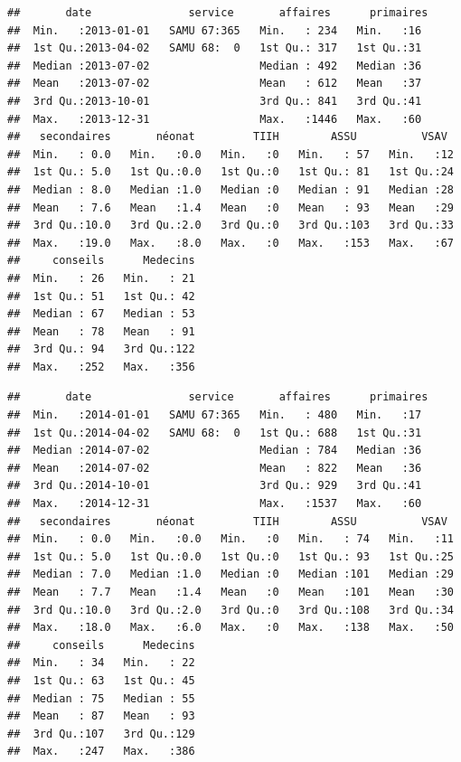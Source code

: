 \documentclass[]{article}
\newenvironment{Shaded}{\begin{snugshade}}{\end{snugshade}}
\newcommand{\KeywordTok}[1]{\textcolor[rgb]{0.13,0.29,0.53}{\textbf{{#1}}}}
\newcommand{\StringTok}[1]{\textcolor[rgb]{0.31,0.60,0.02}{{#1}}}
\newcommand{\CommentTok}[1]{\textcolor[rgb]{0.56,0.35,0.01}{\textit{{#1}}}}
\newcommand{\NormalTok}[1]{{#1}}
\begin{document}
\begin{verbatim}
##       date               service       affaires      primaires 
##  Min.   :2013-01-01   SAMU 67:365   Min.   : 234   Min.   :16  
##  1st Qu.:2013-04-02   SAMU 68:  0   1st Qu.: 317   1st Qu.:31  
##  Median :2013-07-02                 Median : 492   Median :36  
##  Mean   :2013-07-02                 Mean   : 612   Mean   :37  
##  3rd Qu.:2013-10-01                 3rd Qu.: 841   3rd Qu.:41  
##  Max.   :2013-12-31                 Max.   :1446   Max.   :60  
##   secondaires       néonat         TIIH        ASSU          VSAV   
##  Min.   : 0.0   Min.   :0.0   Min.   :0   Min.   : 57   Min.   :12  
##  1st Qu.: 5.0   1st Qu.:0.0   1st Qu.:0   1st Qu.: 81   1st Qu.:24  
##  Median : 8.0   Median :1.0   Median :0   Median : 91   Median :28  
##  Mean   : 7.6   Mean   :1.4   Mean   :0   Mean   : 93   Mean   :29  
##  3rd Qu.:10.0   3rd Qu.:2.0   3rd Qu.:0   3rd Qu.:103   3rd Qu.:33  
##  Max.   :19.0   Max.   :8.0   Max.   :0   Max.   :153   Max.   :67  
##     conseils      Medecins  
##  Min.   : 26   Min.   : 21  
##  1st Qu.: 51   1st Qu.: 42  
##  Median : 67   Median : 53  
##  Mean   : 78   Mean   : 91  
##  3rd Qu.: 94   3rd Qu.:122  
##  Max.   :252   Max.   :356
\end{verbatim}

\begin{Shaded}
\end{Shaded}

\begin{verbatim}
##       date               service       affaires      primaires 
##  Min.   :2014-01-01   SAMU 67:365   Min.   : 480   Min.   :17  
##  1st Qu.:2014-04-02   SAMU 68:  0   1st Qu.: 688   1st Qu.:31  
##  Median :2014-07-02                 Median : 784   Median :36  
##  Mean   :2014-07-02                 Mean   : 822   Mean   :36  
##  3rd Qu.:2014-10-01                 3rd Qu.: 929   3rd Qu.:41  
##  Max.   :2014-12-31                 Max.   :1537   Max.   :60  
##   secondaires       néonat         TIIH        ASSU          VSAV   
##  Min.   : 0.0   Min.   :0.0   Min.   :0   Min.   : 74   Min.   :11  
##  1st Qu.: 5.0   1st Qu.:0.0   1st Qu.:0   1st Qu.: 93   1st Qu.:25  
##  Median : 7.0   Median :1.0   Median :0   Median :101   Median :29  
##  Mean   : 7.7   Mean   :1.4   Mean   :0   Mean   :101   Mean   :30  
##  3rd Qu.:10.0   3rd Qu.:2.0   3rd Qu.:0   3rd Qu.:108   3rd Qu.:34  
##  Max.   :18.0   Max.   :6.0   Max.   :0   Max.   :138   Max.   :50  
##     conseils      Medecins  
##  Min.   : 34   Min.   : 22  
##  1st Qu.: 63   1st Qu.: 45  
##  Median : 75   Median : 55  
##  Mean   : 87   Mean   : 93  
##  3rd Qu.:107   3rd Qu.:129  
##  Max.   :247   Max.   :386
\end{verbatim}
\end{document}
